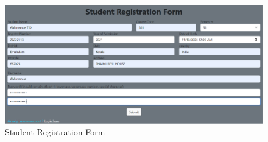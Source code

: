 \documentclass{article}
\begin{document}
\newpage
{}
\begin{figure}[h]
\vspace{1in}
\includegraphics[width=16cm]{Reg.png}
\caption{Student Registration Form}
\label{fig:figure2}
\end{figure}
\begin{verbatim}
    
\end{verbatim}
\newpage
{}
\end{document}
